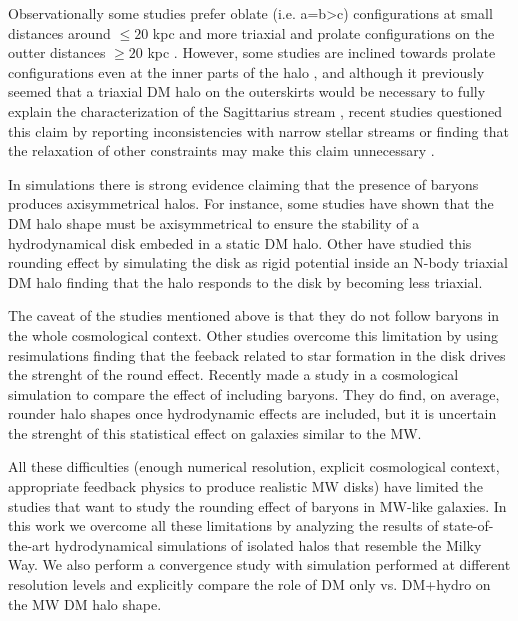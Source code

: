 \documentclass[a4paper,fleqn,usenatbib]{mnras}
\begin{document}
Observationally some studies prefer oblate (i.e. a=b>c) configurations at small
distances around $\leq 20$ kpc
\citep[see][]{Law_and_Majewski_2010,Bovy_et_el._2016,Loebman_et_al._2012,Olling_and_Merrifield_2000,Banerjee_and_Chanda_2011} 
and more triaxial and prolate configurations on the outter distances
$\geq 20$ kpc 
\citep[see][]{Vera-Ciro_and_Helmi_2013,Law_and_Majewski_2009,Deg_and_Widrow_2013,Banerjee_and_Chanda_2011}.
However, some  studies are inclined towards prolate configurations even at the inner
parts of the halo \citep[see][]{Bowden_et_al._2016}, and
although it previously seemed that a triaxial DM halo on the
outerskirts would be necessary to fully explain the characterization
of the Sagittarius stream \citep{Law_and_Majewski_2009}, recent studies
questioned this claim by reporting inconsistencies with narrow stellar
streams \citet{Pearson_et_al._2015} or finding that
the relaxation of other constraints may make this claim unnecessary
\citet{Ibata_et_al._2013}. 

In simulations there is strong evidence claiming that the presence of
baryons produces axisymmetrical halos.  
For instance, some studies have shown that the DM halo shape must be
axisymmetrical to ensure the stability of a hydrodynamical disk
embeded in a static DM halo. 
Other have studied this rounding effect by simulating the disk as rigid
potential inside an N-body triaxial DM
halo \cite{Debattista_et_al._2008,Debattista_et_al._2013,Kazantzidis_et_al._2010}
finding that the halo responds to the disk by becoming less triaxial. 

The caveat of the studies mentioned above is that they do not
follow baryons in the whole cosmological context. 
Other studies overcome this limitation by using resimulations 
\citep{Abadi_et_al._2010,Bryan_et_al._2013} finding that the
feeback related to star formation in the disk drives the strenght of
the round effect. 
Recently \cite{2018arXiv180907255C} made a study in a cosmological
simulation to compare the effect of including baryons. They do find,
on average, rounder halo shapes once hydrodynamic effects are
included, but it is uncertain the strenght of this statistical effect
on galaxies similar to the MW.


All these difficulties (enough numerical resolution, explicit
cosmological context, appropriate feedback physics to produce
realistic MW disks) have limited the studies that want to study the
rounding effect of baryons in MW-like galaxies.
In this work we overcome all these limitations by analyzing the
results of state-of-the-art hydrodynamical simulations of isolated
halos that resemble the Milky Way.
We also perform a convergence study with simulation performed at
different resolution levels and explicitly compare the role of DM only
vs. DM+hydro on the MW DM halo shape.
\end{document}

